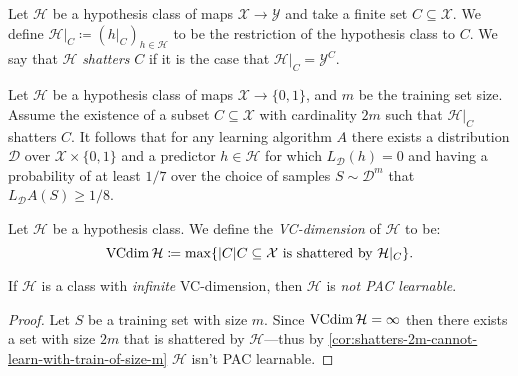 \begin{definition}
    \label{def:restrict-hypothesis-class}
    Let \(\mathcal{H}\) be a hypothesis class of maps \(\mathcal{X} \to \mathcal{Y}\) and take a finite set
    \(C \subseteq \mathcal{X}\). We define \(\mathcal{H}|_C \coloneq (h|_C)_{h \in \mathcal{H}}\) to be the restriction of the
    hypothesis class to \(C\). We say that \(\mathcal{H}\) \emph{shatters} \(C\) if it is the
    case that \(\mathcal{H}|_C = \mathcal{Y}^{C}\).
\end{definition}

\begin{corollary}
    \label{cor:shatters-2m-cannot-learn-with-train-of-size-m}
    Let \(\mathcal{H}\) be a hypothesis class of maps \(\mathcal{X} \to \{0, 1\}\), and \(m\) be the
    training set size. Assume the existence of a subset \(C \subseteq \mathcal{X}\) with cardinality
    \(2 m\) such that \(\mathcal{H}|_C\) shatters \(C\). It follows that for any learning
    algorithm \(A\) there exists a distribution \(\mathcal{D}\) over \(\mathcal{X} \times \{0, 1\}\) and a
    predictor \(h \in \mathcal{H}\) for which \(L_{\mathcal{D}}(h) = 0\) and having a probability of at
    least \(1/7\) over the choice of samples \(S \sim \mathcal{D}^m\) that \(L_{\mathcal{D}}A(S) \geq 1/8\).
\end{corollary}

\begin{definition}[VC-dimension]
    \label{def:vc-dimension}
    Let \(\mathcal{H}\) be a hypothesis class. We define the \emph{VC-dimension} of
    \(\mathcal{H}\) to be:
    \[
        \operatorname{VCdim} \mathcal{H} \coloneq \max \{|C| \relax C \subseteq \mathcal{X} \text{ is shattered by } \mathcal{H}|_C\}.
    \]
\end{definition}

\begin{theorem}
    \label{thm:infinite-VC-dim-not-learnable}
    If \(\mathcal{H}\) is a class with \emph{infinite} VC-dimension, then
    \(\mathcal{H}\) is \emph{not PAC learnable}.
\end{theorem}

\begin{proof}
    Let \(S\) be a training set with size \(m\). Since
    \(\operatorname{VCdim} \mathcal{H} = \infty\) then there exists a set with size \(2 m\) that is shattered by
    \(\mathcal{H}\)---thus by \cref{cor:shatters-2m-cannot-learn-with-train-of-size-m}
    \(\mathcal{H}\) isn't PAC learnable.
\end{proof}

